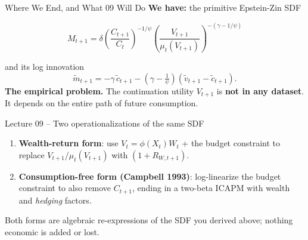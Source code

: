 \documentclass{beamer}
\begin{document}
\begin{frame}[shrink=20]{Where We End, and What 09 Will Do}
	\textbf{We have:} the primitive Epstein-Zin SDF
	\begin{tcolorbox}[colback=blue!5!white, colframe=blue!75!black]
	\begin{equation*}
		M_{t+1} = \delta \left( \frac{C_{t+1}}{C_t} \right)^{-1/\psi} \left( \frac{V_{t+1}}{\mu_t(V_{t+1})} \right)^{-(\gamma-1/\psi)}
	\end{equation*}
	\end{tcolorbox}
	and its log innovation
	\begin{equation*}
		\widetilde{m}_{t+1} = -\gamma\,\widetilde{c}_{t+1} - \left(\gamma - \tfrac{1}{\psi}\right)(\widetilde{v}_{t+1}-\widetilde{c}_{t+1}).
	\end{equation*}
	\vspace{2pt}
	\textbf{The empirical problem.} The continuation utility $V_{t+1}$ is \textbf{not in any dataset}. It depends on the entire path of future consumption.
	\vspace{4pt}
	\begin{block}{Lecture 09 -- Two operationalizations of the same SDF}
		\begin{enumerate}
			\item \textbf{Wealth-return form}: use $V_t = \phi(X_t)W_t$ + the budget constraint to replace $V_{t+1}/\mu_t(V_{t+1})$ with $(1+R_{W,t+1})$.
			\item \textbf{Consumption-free form (Campbell 1993)}: log-linearize the budget constraint to also remove $C_{t+1}$, ending in a two-beta ICAPM with wealth and \emph{hedging} factors.
		\end{enumerate}
		Both forms are algebraic re-expressions of the SDF you derived above; nothing economic is added or lost.
	\end{block}
\end{frame}
\end{document}

